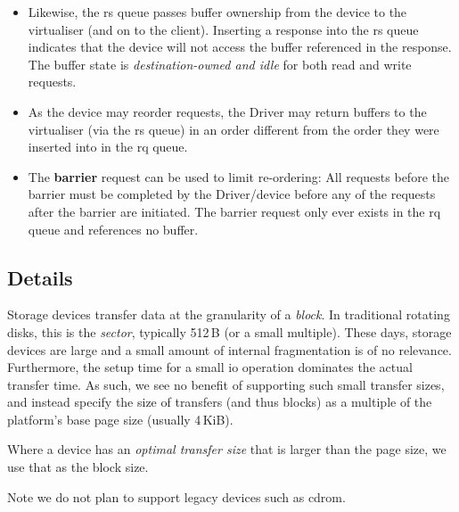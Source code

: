 \documentclass[a4paper,12pt]{report}
\begin{document}
\begin{itemize}
\item Likewise, the \gls{rs} queue passes buffer ownership from the device
  to the virtualiser (and on to the client). Inserting a response into the \gls{rs} queue indicates that
  the device will not access the buffer referenced in the response.
  The buffer state is \emph{destination-owned and idle} for both read and
  write requests.
\item As the device may reorder requests, the Driver may return buffers to
  the virtualiser (via the \gls{rs} queue) in an order different from the order
  they were inserted into in the \gls{rq} queue.
\item The \textbf{barrier} request can be used to limit
  re-ordering: All requests before the barrier must be completed by
  the Driver/device before any of the requests after the barrier are
  initiated. The barrier request only ever exists in the \gls{rq} queue and
  references no buffer.
\end{itemize}

\subsection{Details}

Storage devices transfer data at the granularity of a \emph{block}.
In traditional rotating disks, this is the \emph{sector}, typically
512\,B (or a small multiple). These days, storage devices are large
and a small amount of internal fragmentation is of no
relevance. Furthermore, the setup time for a small \gls{io} operation
dominates the actual transfer time. As such, we see no benefit of
supporting such small transfer sizes, and instead specify the size of
transfers (and thus blocks) as a multiple of the platform's base page
size (usually 4\,KiB).

Where a device has an \emph{optimal transfer size} that is larger than
the page size, we use that as the block size.

Note we do not plan to support legacy devices such as \gls{cdrom}.
\end{document}
